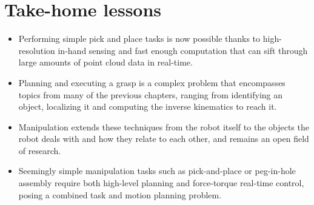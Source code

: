 \section*{Take-home lessons}
\begin{itemize}
\item Performing simple pick and place tasks is now possible thanks to high-resolution in-hand sensing and fast enough computation that can sift through large amounts of point cloud data in real-time. 
\item Planning and executing a grasp is a complex problem that encompasses topics from many of the previous chapters, ranging from identifying an object, localizing it and computing the inverse kinematics to reach it.
\item Manipulation extends these techniques from the robot itself to the objects the robot deals with and how they relate to each other, and remains an open field of research. 
\item Seemingly simple manipulation tasks such as pick-and-place or peg-in-hole assembly require both high-level planning and force-torque real-time control, posing a combined task and motion planning problem. 
\end{itemize}

